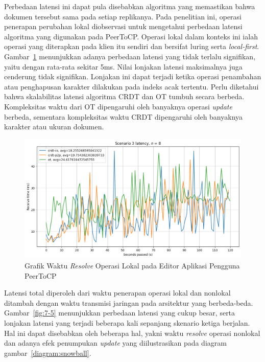 Perbedaan latensi ini dapat pula disebabkan algoritma yang memastikan bahwa dokumen tersebut sama pada setiap replikanya. Pada penelitian ini, operasi penerapan perubahan lokal diobservasi untuk mengetahui perbedaan latensi algoritma yang digunakan pada PeerToCP. Operasi lokal dalam konteks ini ialah operasi yang diterapkan pada klien itu sendiri dan bersifat luring serta \textit{local-first}. Gambar~\ref{fig:12-5} menunjukkan adanya perbedaan latensi yang tidak terlalu signifikan, yaitu dengan rata-rata sekitar 5ms. Nilai lonjakan latensi maksimalnya juga cenderung tidak signifikan. Lonjakan ini dapat terjadi ketika operasi penambahan atau penghapusan karakter dilakukan pada indeks acak tertentu. Perlu diketahui bahwa skalabilitas latensi algoritma CRDT dan OT tumbuh secara berbeda. Kompleksitas waktu dari OT dipengaruhi oleh banyaknya operasi \textit{update} berbeda, sementara kompleksitas waktu CRDT dipengaruhi oleh banyaknya karakter atau ukuran dokumen.

\begin{figure}
 \centering
 \includegraphics[width=15cm]{./assets/skripsi/benchmark-vis_cell_12_output_5}
 \caption{Grafik Waktu \textit{Resolve} Operasi Lokal pada Editor Aplikasi Pengguna PeerToCP}
 \label{fig:12-5}
\end{figure}

Latensi total diperoleh dari waktu penerapan operasi lokal dan nonlokal ditambah dengan waktu transmisi jaringan pada arsitektur yang berbeda-beda. Gambar~\ref{fig:7-5} menunjukkan perbedaan latensi yang cukup besar, serta lonjakan latensi yang terjadi beberapa kali sepanjang skenario ketiga berjalan. Hal ini dapat disebabkan oleh beberapa hal, yakni waktu \textit{resolve} operasi nonlokal dan adanya efek penumpukan \textit{update} yang diilustrasikan pada diagram gambar~\ref{diagram:snowball}.

